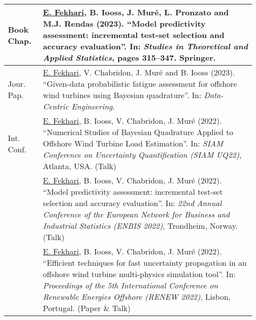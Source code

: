 \begin{center}
    \footnotesize
    \renewcommand*{\arraystretch}{1.4}
    \begin{tabularx}{\textwidth}{l X}
        Book Chap.  & \underline{E. Fekhari}, B. Iooss, J. Muré, L. Pronzato and M.J. Rendas (2023). 
                    ``Model predictivity assessment: incremental test-set selection and accuracy evaluation''. 
                    In: \textit{Studies in Theoretical and Applied Statistics}, pages 315--347. Springer.\\
        \hline
        Jour. Pap.  & \underline{E. Fekhari}, V. Chabridon, J. Muré and B. Iooss (2023).
                    ``Given-data probabilistic fatigue assessment for offshore wind turbines using Bayesian quadrature''. 
                    In: \textit{Data-Centric Engineering}.\\

        \hline
        Int. Conf.  & \underline{E. Fekhari}, B. Iooss, V. Chabridon, J. Muré (2022).
                    ``Numerical Studies of Bayesian Quadrature Applied to Offshore Wind Turbine Load Estimation''.
                    In: \textit{SIAM Conference on Uncertainty Quantification (SIAM UQ22)}, Atlanta, USA. (Talk)\\
        
                    & \underline{E. Fekhari}, B. Iooss, V. Chabridon, J. Muré (2022). 
                    ``Model predictivity assessment: incremental test-set selection and accuracy evaluation''.
                    In: \textit{22nd Annual Conference of the European Network for Business and Industrial Statistics (ENBIS 2022)}, Trondheim, Norway. (Talk)\\
        
                    & \underline{E. Fekhari}, B. Iooss, V. Chabridon, J. Muré (2022). 
                    ``Efficient techniques for fast uncertainty propagation in an offshore wind turbine multi-physics simulation tool''.
                    In: \textit{Proceedings of the 5th International Conference on Renewable Energies Offshore (RENEW 2022)}, Lisbon, Portugal. (Paper \& Talk)\\
        

\end{tabularx}
\end{center}
